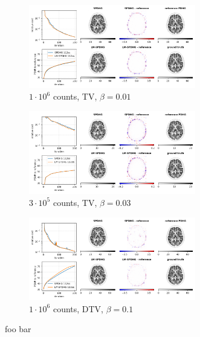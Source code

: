 \begin{figure}
  \centering
  \begin{subfigure}[]{1.0\textwidth}
    \centering
    \includegraphics[width=0.8\textwidth]{./figs/brain2d_counts_1.0E+06_seed_1_beta_1.0E-02_prior_TV_niter_ref_20000_fwhm_4.5_4.5_niter_200.png}
    \caption{$1\cdot10^6$ counts, TV, $\beta = 0.01$}
  \end{subfigure}
  \vfill
  \begin{subfigure}[]{1.0\textwidth}
    \centering
    \includegraphics[width=0.8\textwidth]{./figs/brain2d_counts_3.0E+05_seed_1_beta_3.0E-02_prior_TV_niter_ref_20000_fwhm_4.5_4.5_niter_200.png}
    \caption{$3\cdot10^5$ counts, TV, $\beta = 0.03$}
  \end{subfigure}
  \vfill
  \begin{subfigure}[]{1.0\textwidth}
    \centering
    \includegraphics[width=0.8\textwidth]{./figs/brain2d_counts_1.0E+06_seed_1_beta_1.0E-01_prior_DTV_niter_ref_20000_fwhm_4.5_4.5_niter_200.png}
    \caption{$1\cdot10^6$ counts, DTV, $\beta = 0.1$}
  \end{subfigure}
  \caption{foo bar}
  \label{fig:conv2}
\end{figure}


